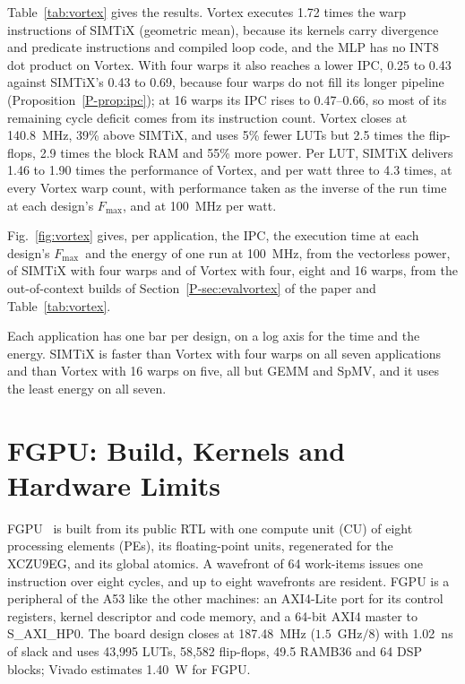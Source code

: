 \documentclass[journal]{IEEEtran}
\newcommand{\Fmax}{$F_{\max}$}
\begin{document}
Table~\ref{tab:vortex} gives the results. Vortex executes 1.72 times the warp
instructions of SIMTiX (geometric mean), because its kernels carry divergence and
predicate instructions and compiled loop code, and the MLP has no INT8 dot product on
Vortex. With four warps it also reaches a lower IPC, 0.25 to 0.43 against SIMTiX's 0.43
to 0.69, because four warps do not fill its longer pipeline (Proposition~\ref{P-prop:ipc});
at 16 warps its IPC rises to 0.47--0.66, so most of its remaining cycle deficit comes
from its instruction count. Vortex closes at 140.8~MHz, 39\% above SIMTiX, and uses
5\% fewer LUTs but 2.5 times the flip-flops, 2.9 times the block RAM and 55\% more
power. Per LUT, SIMTiX delivers 1.46 to 1.90 times the performance of Vortex, and per
watt three to 4.3 times, at every Vortex warp count, with performance taken as the
inverse of the run time at each design's \Fmax, and at 100~MHz per watt.

Fig.~\ref{fig:vortex} gives, per application, the IPC, the execution time at each
design's \Fmax\ and the energy of one run at 100~MHz, from the vectorless power, of
SIMTiX with four warps and of Vortex with four, eight and 16 warps, from the
out-of-context builds of Section~\ref{P-sec:evalvortex} of the paper and Table~\ref{tab:vortex}.

Each application has one bar per design, on a log axis for the time and the energy.
SIMTiX is faster than Vortex with four warps on all seven applications and than Vortex
with 16 warps on five, all but GEMM and SpMV, and it uses the least energy on all seven.



\section{FGPU: Build, Kernels and Hardware Limits}\label{sup:fgpu}
FGPU~\cite{fgpu} is built from its public RTL with one compute unit (CU) of eight
processing elements (PEs), its floating-point units, regenerated for the XCZU9EG, and its
global atomics. A wavefront of 64 work-items issues one instruction over eight cycles, and
up to eight wavefronts are resident. FGPU is a peripheral of the A53 like the other
machines: an AXI4-Lite port for its control registers, kernel descriptor and code memory,
and a 64-bit AXI4 master to S\_AXI\_HP0. The board design closes at 187.48~MHz
($1.5$~GHz$/8$) with 1.02~ns of slack and uses 43,995 LUTs, 58,582 flip-flops, 49.5
RAMB36 and 64 DSP blocks; Vivado estimates 1.40~W for FGPU.
\end{document}
